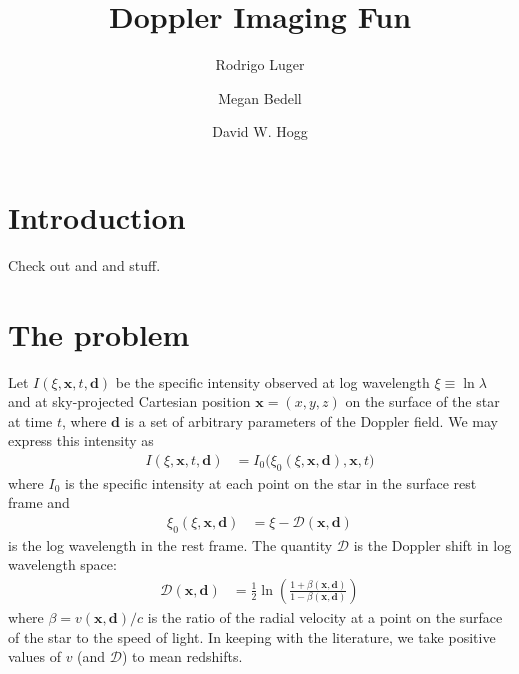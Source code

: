 \documentclass[modern]{aastex62}
\begin{document}
\title{Doppler Imaging Fun}

\author[0000-0002-0296-3826]{Rodrigo Luger}
%
\author{Megan Bedell}
%
\author{David W. Hogg}

%
\section{Introduction}
%
Check out \citet{Luger2019} and \citet{Bedell2019} and stuff.

%
\section{The problem}
\label{sec:the_problem}
%
Let $I(\xi, \mathbf{x}, t, \mathbf{d})$ be the specific 
intensity observed 
at log wavelength $\xi \equiv \ln\lambda$ and at sky-projected 
Cartesian position $\mathbf{x} = (x, y, z)$ on the surface of the 
star at time $t$, where
$\mathbf{d}$ is a set of arbitrary parameters of the Doppler field.
We may express this intensity as
%
\begin{align}
    \label{eq:intro:Ixi}
    I(\xi, \mathbf{x}, t, \mathbf{d}) &= 
        I_0\Big(\xi_0(\xi, \mathbf{x}, \mathbf{d}), \mathbf{x}, t\Big)
\end{align}
%
where $I_0$ is the specific intensity at each point on the star 
in the surface rest frame and 
%
\begin{align}
    \label{eq:intro:xi0}
    \xi_0(\xi, \mathbf{x}, \mathbf{d}) &= 
    \xi - \mathcal{D}(\mathbf{x}, \mathbf{d})
\end{align}
%
is the log wavelength in the rest frame. The quantity $\mathcal{D}$ is
the Doppler shift in log wavelength space:
%
\begin{align}
    \label{eq:intro:D}
    \mathcal{D}(\mathbf{x}, \mathbf{d}) 
        &=
        \frac{1}{2}\ln\left( 
            \frac{1 + \beta(\mathbf{x}, \mathbf{d})}{1 - \beta(\mathbf{x}, 
            \mathbf{d})} 
        \right)
\end{align}
%
where $\beta = v(\mathbf{x}, \mathbf{d}) / c$ is the ratio of the 
radial velocity at a point on the surface of the star to the speed of light.
In keeping with the literature, we take positive values of $v$ (and
$\mathcal{D}$) to mean redshifts.
\end{document}
